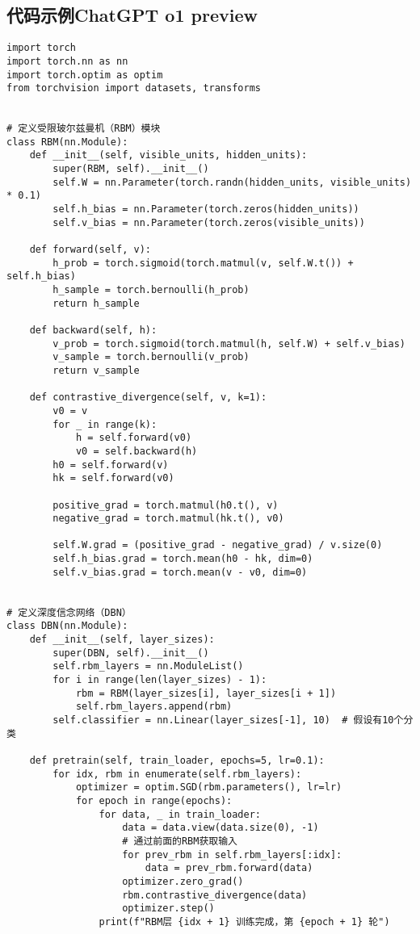 \subsection*{代码示例ChatGPT o1 preview}
\begin{lstlisting}
import torch
import torch.nn as nn
import torch.optim as optim
from torchvision import datasets, transforms


# 定义受限玻尔兹曼机（RBM）模块
class RBM(nn.Module):
    def __init__(self, visible_units, hidden_units):
        super(RBM, self).__init__()
        self.W = nn.Parameter(torch.randn(hidden_units, visible_units) * 0.1)
        self.h_bias = nn.Parameter(torch.zeros(hidden_units))
        self.v_bias = nn.Parameter(torch.zeros(visible_units))

    def forward(self, v):
        h_prob = torch.sigmoid(torch.matmul(v, self.W.t()) + self.h_bias)
        h_sample = torch.bernoulli(h_prob)
        return h_sample

    def backward(self, h):
        v_prob = torch.sigmoid(torch.matmul(h, self.W) + self.v_bias)
        v_sample = torch.bernoulli(v_prob)
        return v_sample

    def contrastive_divergence(self, v, k=1):
        v0 = v
        for _ in range(k):
            h = self.forward(v0)
            v0 = self.backward(h)
        h0 = self.forward(v)
        hk = self.forward(v0)

        positive_grad = torch.matmul(h0.t(), v)
        negative_grad = torch.matmul(hk.t(), v0)

        self.W.grad = (positive_grad - negative_grad) / v.size(0)
        self.h_bias.grad = torch.mean(h0 - hk, dim=0)
        self.v_bias.grad = torch.mean(v - v0, dim=0)


# 定义深度信念网络（DBN）
class DBN(nn.Module):
    def __init__(self, layer_sizes):
        super(DBN, self).__init__()
        self.rbm_layers = nn.ModuleList()
        for i in range(len(layer_sizes) - 1):
            rbm = RBM(layer_sizes[i], layer_sizes[i + 1])
            self.rbm_layers.append(rbm)
        self.classifier = nn.Linear(layer_sizes[-1], 10)  # 假设有10个分类

    def pretrain(self, train_loader, epochs=5, lr=0.1):
        for idx, rbm in enumerate(self.rbm_layers):
            optimizer = optim.SGD(rbm.parameters(), lr=lr)
            for epoch in range(epochs):
                for data, _ in train_loader:
                    data = data.view(data.size(0), -1)
                    # 通过前面的RBM获取输入
                    for prev_rbm in self.rbm_layers[:idx]:
                        data = prev_rbm.forward(data)
                    optimizer.zero_grad()
                    rbm.contrastive_divergence(data)
                    optimizer.step()
                print(f"RBM层 {idx + 1} 训练完成，第 {epoch + 1} 轮")


\end{lstlisting}
